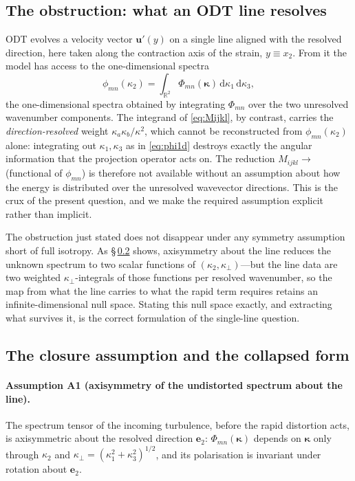 \documentclass[11pt,a4paper]{article}
\newcounter{assumption}
\begin{document}
\subsection{The obstruction: what an ODT line resolves}\label{sec:obstruction}

ODT evolves a velocity vector $\boldsymbol{u}'(y)$ on a single line aligned
with the resolved direction, here taken along the contraction axis of the
strain, $y\equiv x_2$. From it the model has access to the one-dimensional
spectra
\begin{equation}
  \phi_{mn}(\kappa_2)
  = \int_{\mathbb{R}^2}
      \Phi_{mn}(\boldsymbol{\kappa})\,
      \mathrm{d}\kappa_1\,\mathrm{d}\kappa_3,
  \label{eq:phi1d}
\end{equation}
the one-dimensional spectra obtained by integrating $\Phi_{mn}$ over the two
unresolved wavenumber components. The integrand of \eqref{eq:Mijkl}, by
contrast, carries the \emph{direction-resolved} weight
$\kappa_a\kappa_b/\kappa^2$, which cannot be reconstructed from
$\phi_{mn}(\kappa_2)$ alone: integrating out $\kappa_1,\kappa_3$ as in
\eqref{eq:phi1d} destroys exactly the angular information that the projection
operator acts on. The reduction $M_{ijkl}\!\to\!$ (functional of
$\phi_{mn}$) is therefore not available without an assumption about how the
energy is distributed over the unresolved wavevector directions. This is the
crux of the present question, and we make the required assumption explicit
rather than implicit.

The obstruction just stated does not disappear under any symmetry
assumption short of full isotropy. As \S\,\ref{sec:assumption} shows,
axisymmetry about the line reduces the unknown spectrum to two scalar
functions of $(\kappa_2,\kappa_\perp)$---but the line data are two weighted
$\kappa_\perp$-integrals of those functions per resolved wavenumber, so the
map from what the line carries to what the rapid term requires retains an
infinite-dimensional null space. Stating this null space exactly, and
extracting what survives it, is the correct formulation of the single-line
question.

\subsection{The closure assumption and the collapsed form}
\label{sec:assumption}

\paragraph{Assumption A1 (axisymmetry of the undistorted spectrum about the
line).} The spectrum tensor of the incoming turbulence, before the rapid
distortion acts, is axisymmetric about the resolved direction $\boldsymbol{e}_2$:
$\Phi_{mn}(\boldsymbol{\kappa})$ depends on $\boldsymbol{\kappa}$ only through
$\kappa_2$ and $\kappa_\perp=(\kappa_1^2+\kappa_3^2)^{1/2}$, and its
polarisation is invariant under rotation about $\boldsymbol{e}_2$.
\end{document}

